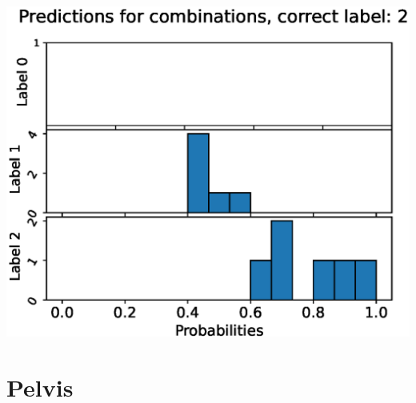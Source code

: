 \begin{center}
\begin{minipage}{0.33\textwidth}
  \includegraphics[width=\textwidth]{files/figs/app/hists/trunk/pc2.eps}
\end{minipage}
\end{center}

\newpage
\section{Pelvis}

